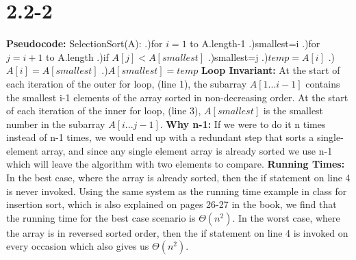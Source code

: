 \documentclass[12pt]{article}
\newcommand\tab[1][1cm]{\hspace*{#1}}
\begin{document}
\section{2.2-2}
\textbf{Pseudocode:} \newline \newline
SelectionSort(A): .)\tab for $i=1$ to A.length-1 .)\tab \tab smallest=i .)\tab \tab for $j=i+1$ to A.length .)\tab \tab \tab if $A[j]<A[smallest]$ .)\tab \tab \tab \tab smallest=j .)\tab \tab $temp=A[i]$ .)\tab \tab $A[i]=A[smallest]$ .)\tab \tab $A[smallest]=temp$ \newline \newline
\textbf{Loop Invariant:} \newline \newline
At the start of each iteration of the outer for loop, (line 1), the subarray $A[1...i-1]$ contains the smallest i-1 elements of the array sorted in non-decreasing order. At the start of each iteration of the inner for loop, (line 3), $A[smallest]$ is the smallest number in the subarray $A[i...j-1]$. \newline \newline
\textbf{Why n-1:} \newline \newline
If we were to do it n times instead of n-1 times, we would end up with a redundant step that sorts a single-element array, and since any single element array is already sorted we use n-1 which will leave the algorithm with two elements to compare. \newline \newline
\textbf{Running Times:} \newline \newline
In the best case, where the array is already sorted, then the if statement on line 4 is never invoked. Using the same system as the running time example in class for insertion sort, which is also explained on pages 26-27 in the book, we find that the running time for the best case scenario is $\Theta(n^2)$. \newline
In the worst case, where the array is in reversed sorted order, then the if statement on line 4 is invoked on every occasion which also gives us $\Theta(n^2)$.
\end{document}

